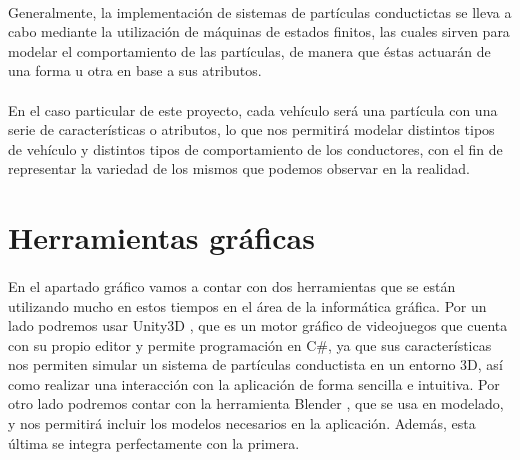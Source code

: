 	\paragraph{}
	Generalmente, la implementación de sistemas de partículas conductictas se lleva a cabo mediante la utilización de máquinas de estados finitos, las cuales sirven para modelar el comportamiento de las partículas, de manera que éstas actuarán de una forma u otra en base a sus atributos.
	
	\paragraph{}
	En el caso particular de este proyecto, cada vehículo será una partícula con una serie de características o atributos, lo que nos permitirá modelar distintos tipos de vehículo y distintos tipos de comportamiento de los conductores, con el fin de representar la variedad de los mismos que podemos observar en la realidad.
	
\section{Herramientas gráficas}

	\paragraph{}
	En el apartado gráfico vamos a contar con dos herramientas que se están utilizando mucho en estos tiempos en el área de la informática gráfica. Por un lado podremos usar Unity3D \cite{Unity_web}, que es un motor gráfico de videojuegos que cuenta con su propio editor y permite programación en C\#, ya que sus características nos permiten simular un sistema de partículas conductista en un entorno 3D, así como realizar una interacción con la aplicación de forma sencilla e intuitiva. Por otro lado podremos contar con la herramienta Blender \cite{Blender_web}, que se usa en modelado, y nos permitirá incluir los modelos necesarios en la aplicación. Además, esta última se integra perfectamente con la primera.